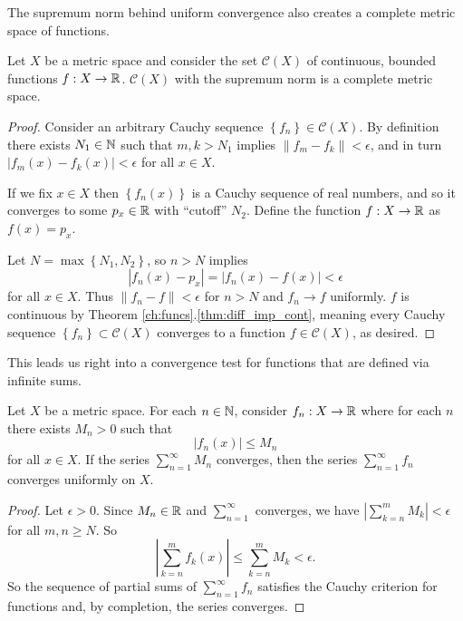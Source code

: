 \documentclass[../m131main.tex]{subfiles}
\begin{document}
The supremum norm behind uniform convergence also creates a complete metric space of functions.

\pagebreak

\begin{theorem}[]
    Let $X$ be a metric space and consider the set $\mathcal{C}(X)$ of continuous, bounded functions $f : X \to \mathbb{R}$.
    $\mathcal{C}(X)$ with the supremum norm is a complete metric space.
\end{theorem}

\begin{proof}
    Consider an arbitrary Cauchy sequence $\left\{ f_n \right\} \in \mathcal{C}(X)$.
    By definition there exists $N_1 \in \mathbb{N}$ such that $m,k > N_1$ implies $\| f_m - f_k \| < \epsilon$, and in turn $|f_m(x) - f_k(x)| < \epsilon$ for all $x \in X$.

    If we fix $x \in X$ then $\left\{ f_n(x) \right\}$ is a Cauchy sequence of real numbers, and so it converges to some $p_x \in \mathbb{R}$ with ``cutoff'' $N_2$.
    Define the function $f : X \to \mathbb{R}$ as $f(x) = p_x$.

    Let $N = \max \left\{ N_1, N_2 \right\}$, so $n > N$ implies
    \[ |f_n(x) - p_x| = |f_n(x) - f(x)| < \epsilon \]
    for all $x \in X$.
    Thus $\| f_n - f \| < \epsilon$ for $n > N$ and $f_n \to f$ uniformly.
    $f$ is continuous by Theorem \ref{ch:funcs}.\ref{thm:diff_imp_cont}, meaning every Cauchy sequence $\left\{ f_n \right\} \subset \mathcal{C}(X)$ converges to a function $f \in \mathcal{C}(X)$, as desired.
\end{proof}

This leads us right into a convergence test for functions that are defined via infinite sums.

\begin{theorem}
    Let $X$ be a metric space.
    For each $n \in \mathbb{N}$, consider $f_n : X \to \mathbb{R}$ where for each $n$ there exists $M_n > 0$ such that
    \[ |f_n(x)| \leq M_n \]
    for all $x \in X$.
    If the series $\sum_{n=1}^{\infty} M_n$ converges, then the series $\sum_{n=1}^{\infty} f_n$ converges uniformly on $X$.
\end{theorem}

\begin{proof}
    Let $\epsilon > 0$.
    Since $M_n \in \mathbb{R}$ and $\sum_{n=1}^{\infty}$ converges, we have $|\sum_{k=n}^{m} M_k| < \epsilon$ for all $m,n \geq N$.
    So
    \[ \left| \sum_{k=n}^m{ f_k(x)} \right| \leq \sum_{k=n}^{m} M_k < \epsilon. \]
    So the sequence of partial sums of $\sum_{n=1}^{\infty} f_n$ satisfies the Cauchy criterion for functions and, by completion, the series converges.
\end{proof}
\end{document}
